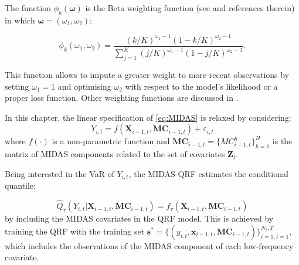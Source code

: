 The function $\phi_k(\boldsymbol{\omega})$ is the Beta weighting function (see \cite{candila2023mixed} and references therein) in which $\boldsymbol{\omega}=(\omega_1, \omega_2)$:

\begin{equation}
	\label{eq:beta}
	\phi_k(\omega_1, \omega_2)=\frac{(k/K)^{\omega_1-1}(1-k/K)^{\omega_2-1}}{\sum_{j=1}^{K}(j/K)^{\omega_1-1}(1-j/K)^{\omega_2-1}}.
\end{equation}

This function allows to impute a greater weight to more recent observations by setting $\omega_1=1$ and optimising $\omega_2$ with respect to the model's likelihood or a proper loss function. 
Other weighting functions are discussed in \cite{ghysels2019estimating}. 

\vspace{0.15in}

\noindent In this chapter, the linear specification of \eqref{eq:MIDAS} is relaxed by considering:
\begin{equation}
\label{eq:RF2}
Y_{i,t}=f(\mathbf{X}_{i-1,t}, \mathbf{MC}_{i-1,t})+\varepsilon_{i,t}
\end{equation}
where $f(\cdot)$ is a non-parametric function and $\mathbf{MC}_{i-1,t}=\{MC_{i-1,t}^h\}_{h=1}^H$  is the matrix of MIDAS components related to the set of covariates $\mathbf{Z}_t$.

\vspace{0.15in}

\noindent Being interested in the VaR of $Y_{i,t}$, the MIDAS-QRF estimates the conditional quantile:

\begin{equation}
\hat{Q}_{\tau}(Y_{i,t}|\mathbf{X}_{i-1,t}, \mathbf{MC}_{i-1,t})=f_{\tau}(\mathbf{X}_{i-1,t}, \mathbf{MC}_{i-1,t})
\end{equation}
by including the MIDAS covariates in the QRF model. This is achieved by training the QRF with the training set $\mathbf{s}^*=\{(y_{i,t}, \mathbf{x}_{i-1,t}, \mathbf{MC}_{i-1,t})\}_{i=1, t=1}^{N_t,T}$, which includes the observations of the MIDAS component of each low-frequency covariate.



